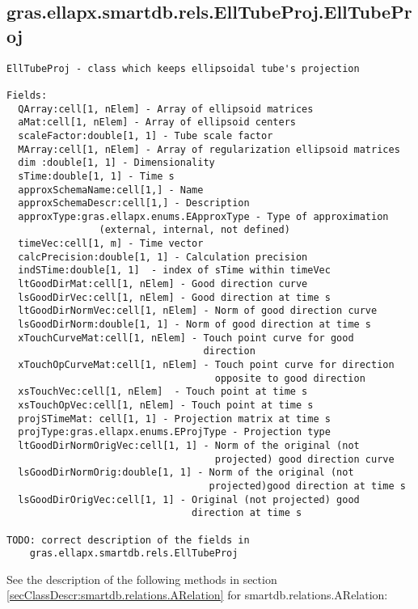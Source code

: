 \subsection{\texorpdfstring{gras.ellapx.smartdb.rels.EllTubeProj.EllTubeProj}{EllTubeProj}}\label{method:gras.ellapx.smartdb.rels.EllTubeProj.EllTubeProj}
\begin{verbatim}
EllTubeProj - class which keeps ellipsoidal tube's projection

Fields:
  QArray:cell[1, nElem] - Array of ellipsoid matrices
  aMat:cell[1, nElem] - Array of ellipsoid centers
  scaleFactor:double[1, 1] - Tube scale factor
  MArray:cell[1, nElem] - Array of regularization ellipsoid matrices
  dim :double[1, 1] - Dimensionality
  sTime:double[1, 1] - Time s
  approxSchemaName:cell[1,] - Name
  approxSchemaDescr:cell[1,] - Description
  approxType:gras.ellapx.enums.EApproxType - Type of approximation
                (external, internal, not defined)
  timeVec:cell[1, m] - Time vector
  calcPrecision:double[1, 1] - Calculation precision
  indSTime:double[1, 1]  - index of sTime within timeVec
  ltGoodDirMat:cell[1, nElem] - Good direction curve
  lsGoodDirVec:cell[1, nElem] - Good direction at time s
  ltGoodDirNormVec:cell[1, nElem] - Norm of good direction curve
  lsGoodDirNorm:double[1, 1] - Norm of good direction at time s
  xTouchCurveMat:cell[1, nElem] - Touch point curve for good
                                  direction
  xTouchOpCurveMat:cell[1, nElem] - Touch point curve for direction
                                    opposite to good direction
  xsTouchVec:cell[1, nElem]  - Touch point at time s
  xsTouchOpVec:cell[1, nElem] - Touch point at time s
  projSTimeMat: cell[1, 1] - Projection matrix at time s
  projType:gras.ellapx.enums.EProjType - Projection type
  ltGoodDirNormOrigVec:cell[1, 1] - Norm of the original (not
                                    projected) good direction curve
  lsGoodDirNormOrig:double[1, 1] - Norm of the original (not
                                   projected)good direction at time s
  lsGoodDirOrigVec:cell[1, 1] - Original (not projected) good
                                direction at time s

TODO: correct description of the fields in
    gras.ellapx.smartdb.rels.EllTubeProj
\end{verbatim}


See the description of the following methods in section \ref{secClassDescr:smartdb.relations.ARelation}
 for smartdb.relations.ARelation:

